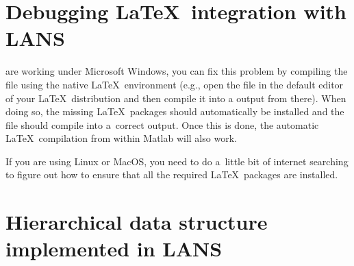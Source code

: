 \clearpage

\appendix

\renewcommand{\thesection}{\Alph{section}}
\renewcommand{\thefigure}{\Alph{section}.\arabic{figure}}
\setcounter{figure}{0}

\section{Debugging \LaTeX\ integration with LANS}

are working under Microsoft Windows, you can fix this problem by compiling the  file using the native \LaTeX\ environment (e.g., open the  file in the default editor of your \LaTeX\ distribution and then compile it into a  output from there). When doing so, the missing \LaTeX\ packages should automatically be installed and the  file should compile into a~correct  output. Once this is done, the automatic \LaTeX\ compilation from within Matlab will also work.

If you are using Linux or MacOS, you need to do a~little bit of internet searching to figure out how to ensure that all the required \LaTeX\ packages are installed.



\section[Appendix]{Hierarchical data structure implemented in LANS}

